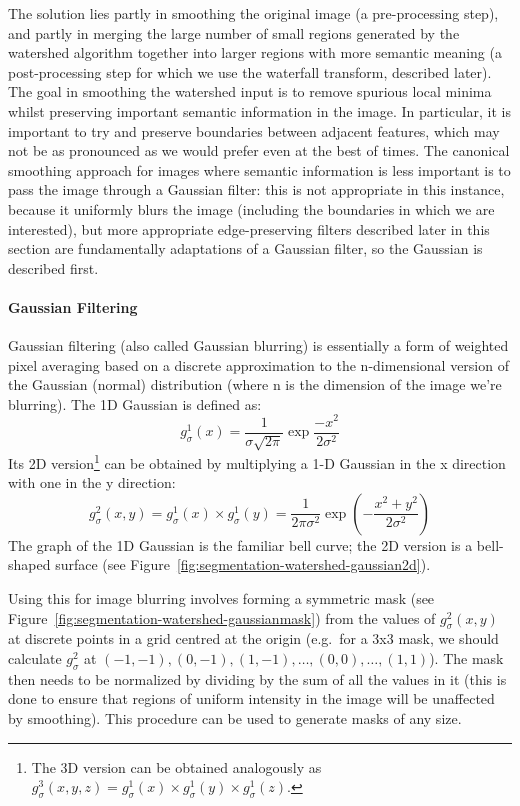 
The solution lies partly in smoothing the original image (a pre-processing step), and partly in merging the large number of small regions generated by the watershed algorithm together into larger regions with more semantic meaning (a post-processing step for which we use the waterfall transform, described later). The goal in smoothing the watershed input is to remove spurious local minima whilst preserving important semantic information in the image. In particular, it is important to try and preserve boundaries between adjacent features, which may not be as pronounced as we would prefer even at the best of times. The canonical smoothing approach for images where semantic information is less important is to pass the image through a Gaussian filter: this is not appropriate in this instance, because it uniformly blurs the image (including the boundaries in which we are interested), but more appropriate edge-preserving filters described later in this section are fundamentally adaptations of a Gaussian filter, so the Gaussian is described first.

\paragraph{Gaussian Filtering}

Gaussian filtering (also called Gaussian blurring) is essentially a form of weighted pixel averaging based on a discrete approximation to the n-dimensional version of the Gaussian (normal) distribution (where n is the dimension of the image we're blurring). The 1D Gaussian is defined as:
%
\[
g_\sigma^1(x) = \frac{1}{\sigma\sqrt{2\pi}} \exp \frac{-x^2}{2\sigma^2}
\]
%
Its 2D version\footnote{The 3D version can be obtained analogously as $g_\sigma^3(x,y,z) = g_\sigma^1(x) \times g_\sigma^1(y) \times g_\sigma^1(z)$.} can be obtained by multiplying a 1-D Gaussian in the x direction with one in the y direction:
%
\[
g_\sigma^2(x,y) = g_\sigma^1(x) \times g_\sigma^1(y) = \frac{1}{2\pi\sigma^2} \exp \left( -\frac{x^2+y^2}{2\sigma^2} \right)
\]
%
The graph of the 1D Gaussian is the familiar bell curve; the 2D version is a bell-shaped surface (see Figure~\ref{fig:segmentation-watershed-gaussian2d}).


Using this for image blurring involves forming a symmetric mask (see Figure~\ref{fig:segmentation-watershed-gaussianmask}) from the values of $g_\sigma^2(x,y)$ at discrete points in a grid centred at the origin (e.g.~for a 3x3 mask, we should calculate $g_\sigma^2$ at $(-1,-1), (0,-1), (1,-1), \ldots, (0,0), \ldots, (1,1)$). The mask then needs to be normalized by dividing by the sum of all the values in it (this is done to ensure that regions of uniform intensity in the image will be unaffected by smoothing). This procedure can be used to generate masks of any size.

